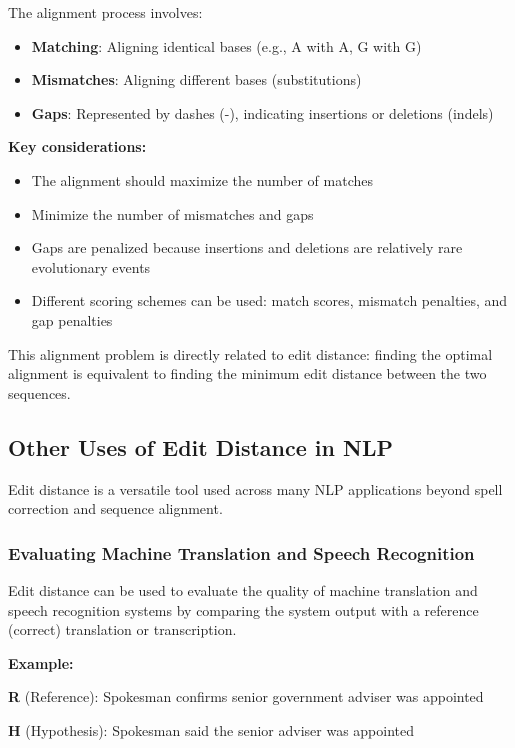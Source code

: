 \documentclass[11pt,a4paper]{article}
\theoremstyle{definition}
\theoremstyle{plain}
\theoremstyle{remark}
\begin{document}
The alignment process involves:
\begin{itemize}
    \item \textbf{Matching}: Aligning identical bases (e.g., A with A, G with G)
    \item \textbf{Mismatches}: Aligning different bases (substitutions)
    \item \textbf{Gaps}: Represented by dashes (-), indicating insertions or deletions (indels)
\end{itemize}

\textbf{Key considerations:}
\begin{itemize}
    \item The alignment should maximize the number of matches
    \item Minimize the number of mismatches and gaps
    \item Gaps are penalized because insertions and deletions are relatively rare evolutionary events
    \item Different scoring schemes can be used: match scores, mismatch penalties, and gap penalties
\end{itemize}

This alignment problem is directly related to edit distance: finding the optimal alignment is equivalent to finding the minimum edit distance between the two sequences.

\subsection{Other Uses of Edit Distance in NLP}

Edit distance is a versatile tool used across many NLP applications beyond spell correction and sequence alignment.

\subsubsection{Evaluating Machine Translation and Speech Recognition}

Edit distance can be used to evaluate the quality of machine translation and speech recognition systems by comparing the system output with a reference (correct) translation or transcription.

\textbf{Example:}

\textbf{R} (Reference): Spokesman confirms senior government adviser was appointed

\textbf{H} (Hypothesis): Spokesman said the senior adviser was appointed
\end{document}
